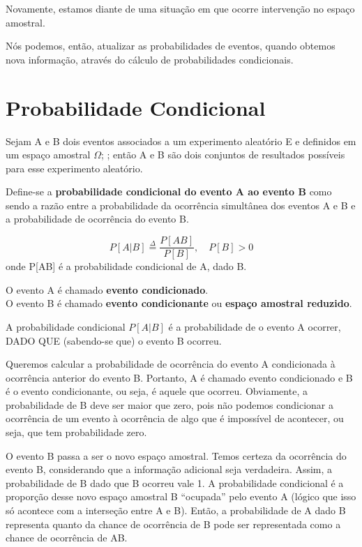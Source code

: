 \documentclass[
]{book}
\theoremstyle{definition}
\theoremstyle{definition}
\theoremstyle{definition}
\theoremstyle{remark}
\begin{document}
Novamente, estamos diante de uma situação em que ocorre intervenção no espaço amostral.

Nós podemos, então, atualizar as probabilidades de eventos, quando obtemos nova informação, através do cálculo de probabilidades condicionais.

\hypertarget{probabilidade-condicional}{%
\section{Probabilidade Condicional}\label{probabilidade-condicional}}

Sejam A e B dois eventos associados a um experimento aleatório E e definidos em um espaço amostral \(\Omega\); ; então A e B são dois conjuntos de resultados possíveis para esse experimento aleatório.

Define-se a \textbf{probabilidade condicional do evento A ao evento B} como sendo a razão entre a probabilidade da ocorrência simultânea dos eventos A e B e a probabilidade de ocorrência do evento B.

\[P[A|B] \stackrel{\Delta}{=} \frac{P[AB]}{P[B]}, \quad P[B] > 0 \]
onde P{[}A\textbar B{]} é a probabilidade condicional de A, dado B.

O evento A é chamado \textbf{evento condicionado}.\\
O evento B é chamado \textbf{evento condicionante} ou \textbf{espaço amostral reduzido}.

A probabilidade condicional \(P[A|B]\) é a probabilidade de o evento A ocorrer, DADO QUE (sabendo-se que) o evento B ocorreu.

Queremos calcular a probabilidade de ocorrência do evento A condicionada à ocorrência anterior do evento B. Portanto, A é chamado evento condicionado e B é o evento condicionante, ou seja, é aquele que ocorreu. Obviamente, a probabilidade de B deve ser maior que zero, pois não podemos condicionar a ocorrência de um evento à ocorrência de algo que é impossível de acontecer, ou seja, que tem probabilidade zero.

O evento B passa a ser o novo espaço amostral. Temos certeza da ocorrência do evento B, considerando que a informação adicional seja verdadeira. Assim, a probabilidade de B dado que B ocorreu vale 1. A probabilidade condicional é a proporção desse novo espaço amostral B ``ocupada'' pelo evento A (lógico que isso só acontece com a interseção entre A e B). Então, a probabilidade de A dado B representa quanto da chance de ocorrência de B pode ser representada como a chance de ocorrência de AB.
\end{document}
